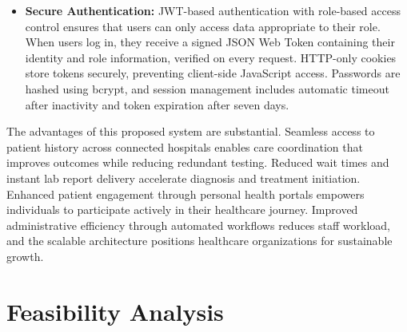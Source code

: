 \begin{itemize}
    \item \textbf{Secure Authentication:} JWT-based authentication with role-based access control ensures that users can only access data appropriate to their role. When users log in, they receive a signed JSON Web Token containing their identity and role information, verified on every request. HTTP-only cookies store tokens securely, preventing client-side JavaScript access. Passwords are hashed using bcrypt, and session management includes automatic timeout after inactivity and token expiration after seven days.
\end{itemize}

\justifying
\noindent The advantages of this proposed system are substantial. Seamless access to patient history across connected hospitals enables care coordination that improves outcomes while reducing redundant testing. Reduced wait times and instant lab report delivery accelerate diagnosis and treatment initiation. Enhanced patient engagement through personal health portals empowers individuals to participate actively in their healthcare journey. Improved administrative efficiency through automated workflows reduces staff workload, and the scalable architecture positions healthcare organizations for sustainable growth.

\section{Feasibility Analysis}

